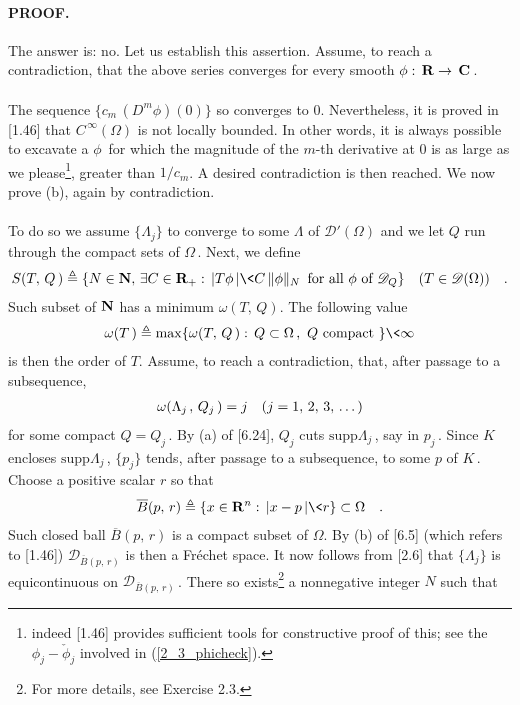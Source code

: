 \paragraph{PROOF.} The answer is: no. Let us establish this assertion. Assume, to reach a contradiction, that the above series converges for every smooth $\phi:\, {\mathbf R}\to\,{\mathbf C}\,$. \\
\\
The sequence $\{c_m\, (D^m\phi)(0)\}$ so converges to $0$. Nevertheless, it is proved in [1.46] that $C^{\,\infty}(\Omega)$ is not locally bounded. In other words, it is always possible to excavate a $\phi\,$ for which the magnitude of the $m$-th derivative at $0$ is as large as we please\footnote{indeed [1.46] provides sufficient tools for constructive proof of this; see the $\phi_j-\check{\phi}_j$ involved in (\ref{2_3_phicheck}).}, \eg greater than $1/c_m$.
 A desired contradiction is then reached. We now prove (b), again by contradiction.\\
\\
To do so we assume $\{\Lambda_j\}$ to converge to some $\Lambda$ of $\mathscr{D}'(\Omega)$ and we let $Q$ run through the compact sets of $\Omega\,$. Next, we define
\begin{align}{\label{6_6_1}
S(T,\, Q\,)\Def \{N\in \N, \, \exists C\in \R_+:\, \lvert T\phi\, \rvert \< C\, \| \phi \|_N \,\text{ for all }\phi \text{ of } \mathscr{D}_Q \}\quad (T\in \mathscr{D}(\Omega))\quad .
}\end{align}
Such subset of ${\mathbf N}$ has a minimum $\omega(T,\, Q)$. The following value
\begin{align}{\label{6_6_2}
\omega (T\,) \Def \max\{ \omega(T,\, Q\,): \, Q\subset \Omega\, , \,\, Q \text{ compact }\}\< \infty
}\end{align}
is then the order of $T$. Assume, to reach a contradiction, that, after passage to a subsequence,
\begin{align}{\label{6_6_3}
\omega (\Lambda_{j\,},\, Q_j\,) =j\quad (j=1,\, 2,\, 3,\, \dots)
}\end{align}
for some compact $Q=Q_j\,$. By (a) of [6.24], $Q_j$ cuts $\text{supp}\Lambda_j\,$, say in $p_j\,$. Since $K$ encloses $\text{supp}\Lambda_j\,$, $\{p_j\}$ tends, after passage to a subsequence, to some $p$ of $K\,$.
Choose a positive scalar $r$ so that 
\begin{align}{\label{6_6_5}
\overline{B}(p,\, r)\Def \{ x\in \R^n:\, \lvert x-p\,\rvert\< r\}\subset \Omega \quad .
}\end{align}
Such closed ball $\overline{B}(p,\, r)$ is a compact subset of $\Omega$. By (b) of [6.5] (which refers to [1.46])  $\mathscr{D}_{\overline{B}(p,\, r)}$ is then a Fréchet space. It now follows from [2.6] that $\{\Lambda_j\}$ is equicontinuous on $\mathscr{D}_{\overline{B}(p,\, r)}\,$. There so exists\footnote{For more details, see Exercise 2.3.} a nonnegative integer $N$ such that 
